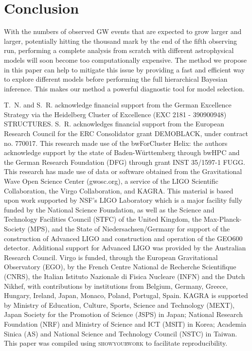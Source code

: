 \documentclass[sn-aps, pdflatex]{sn-jnl}
\begin{document}
\section{Conclusion}
\label{sec:conclusion}

With the numbers of observed \ac{GW} events that are expected to grow larger and larger, potentially hitting the thousand mark by the end of the fifth observing run, performing a complete analysis from scratch with different astrophysical models will soon become too computationally expensive.
The method we propose in this paper can help to mitigate this issue by providing a fast and efficient way to explore different models before performing the full hierarchical Bayesian inference.
This makes our method a powerful diagnostic tool for model selection.

\backmatter


T.~N. and S.~R. acknowledge financial support from the German Excellence Strategy via the Heidelberg Cluster of Excellence (EXC 2181 - 390900948) STRUCTURES.
S.~R. acknowledges financial support from the European Research Council for the ERC Consolidator grant DEMOBLACK, under contract no. 770017. 
This research made use of the bwForCluster Helix: the authors acknowledge support by the state of Baden-Württemberg through bwHPC and the German Research Foundation (DFG) through grant INST 35/1597-1 FUGG.
This research has made use of data or software obtained from the Gravitational Wave Open Science Center (gwosc.org), a service of the LIGO Scientific Collaboration, the Virgo Collaboration, and KAGRA. This material is based upon work supported by NSF's LIGO Laboratory which is a major facility fully funded by the National Science Foundation, as well as the Science and Technology Facilities Council (STFC) of the United Kingdom, the Max-Planck-Society (MPS), and the State of Niedersachsen/Germany for support of the construction of Advanced LIGO and construction and operation of the GEO600 detector. Additional support for Advanced LIGO was provided by the Australian Research Council. Virgo is funded, through the European Gravitational Observatory (EGO), by the French Centre National de Recherche Scientifique (CNRS), the Italian Istituto Nazionale di Fisica Nucleare (INFN) and the Dutch Nikhef, with contributions by institutions from Belgium, Germany, Greece, Hungary, Ireland, Japan, Monaco, Poland, Portugal, Spain. KAGRA is supported by Ministry of Education, Culture, Sports, Science and Technology (MEXT), Japan Society for the Promotion of Science (JSPS) in Japan; National Research Foundation (NRF) and Ministry of Science and ICT (MSIT) in Korea; Academia Sinica (AS) and National Science and Technology Council (NSTC) in Taiwan.
This paper was compiled using \textsc{showyourwork} \cite{Luger2021} to facilitate reproducibility.


\end{document}
